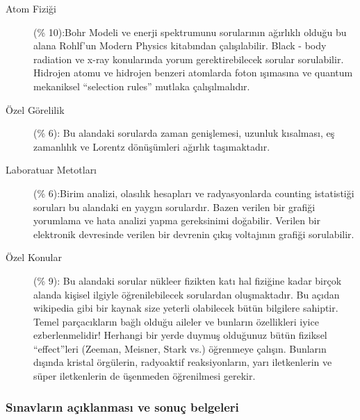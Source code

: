 \documentclass[12pt]{article}
\begin{document}
\begin{description}
\item[Atom Fiziği] (\% 10):Bohr Modeli ve enerji spektrumunu sorularının ağırlıklı olduğu bu alana Rohlf’un Modern Physics kitabından çalışılabilir. Black - body radiation ve x-ray konularında yorum gerektirebilecek sorular sorulabilir. Hidrojen atomu ve hidrojen benzeri atomlarda foton ışımasına ve quantum mekaniksel “selection rules” mutlaka çalışılmalıdır.
\item[Özel Görelilik] (\% 6): Bu alandaki sorularda zaman genişlemesi, uzunluk kısalması, eş zamanlılık ve Lorentz dönüşümleri ağırlık taşımaktadır. 
\item[Laboratuar Metotları] (\% 6):Birim analizi, olasılık hesapları ve radyasyonlarda counting istatistiği soruları bu alandaki en yaygın sorulardır. Bazen verilen bir grafiği yorumlama ve hata analizi yapma gereksinimi doğabilir. Verilen bir elektronik devresinde verilen bir devrenin çıkış voltajının grafiği sorulabilir. 
\item[Özel Konular] (\% 9): Bu alandaki sorular nükleer fizikten katı hal fiziğine kadar birçok alanda kişisel ilgiyle öğrenilebilecek sorulardan oluşmaktadır. Bu açıdan wikipedia gibi bir kaynak size yeterli olabilecek bütün bilgilere sahiptir. Temel parçacıkların bağlı olduğu aileler ve bunların özellikleri iyice ezberlenmelidir! Herhangi bir yerde duymuş olduğunuz bütün fiziksel “effect”leri (Zeeman, Meisner, Stark vs.) öğrenmeye çalışın. Bunların dışında kristal örgülerin, radyoaktif reaksiyonların, yarı iletkenlerin ve süper iletkenlerin de üşenmeden öğrenilmesi gerekir. 

\end{description}


\subsubsection{Sınavların açıklanması ve sonuç belgeleri}
\end{document}
